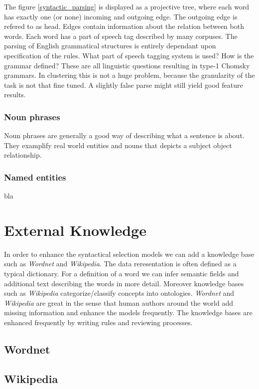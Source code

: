   The figure \ref{syntactic_parsing} is displayed as a projective tree, where each word has exactly one (or none) incoming and outgoing edge. The outgoing edge is refered to as head. Edges contain information about the relation between both words. Each word has a part of speech tag described by many corpuses. \cite[Wordnet, Penn-treebank, Google-ngrams]{Nothing}
  The parsing of English grammatical structures is entirely dependant upon specification of the rules. What part of speech tagging system is used? How is the grammar defined? These are all linguistic questions resulting in type-1 Chomsky grammars. \cite[Chomsky]{Nothing}
  In clustering this is not a huge problem, because the granularity of the task is not that fine tuned. A slightly false parse might still yield good feature results.

  \subsubsection{Noun phrases}
  Noun phrases are generally a good way of describing what a sentence is about. They examplify real world entities and nouns that depicts a subject object relationship.

  \subsubsection{Named entities}

  bla


\section{External Knowledge}
\label{sec:semantic_selection}
  
  \newcommand\waw{\emph{Wordnet} and \emph{Wikipedia}}

  In order to enhance the syntactical selection models we can add a knowledge base such as \waw{}. The data reresentation is often defined as a typical dictionary. For a definition of a word we can infer semantic fields and additional text describing the words in more detail. Moreover knowledge bases such as \emph{Wikipedia} categorize/classify concepts into ontologies. \waw{} are great in the sense that human authors around the world add missing information and enhance the models frequently. The knowledge bases are enhanced frequently by writing rules and reviewing processes.

  \subsection{Wordnet}
  \label{sec:wordnet}

  \subsection{Wikipedia}
  \label{sec:wikpedia}
  

